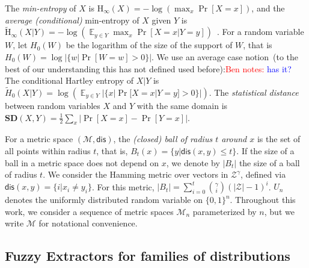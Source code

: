 \documentclass[11pt]{article}
\DeclareMathOperator*{\expe}{\mathbb{E}}
\newcommand{\dis}{\ensuremath{\mathsf{dis}}}
\newcommand{\Hoo}{\mathrm{H}_\infty}
\newcommand{\Hav}{\tilde{\mathrm{H}}_\infty}
\newcommand{\sd}{\ensuremath{\mathbf{SD}}}
\newtheorem{definition}[theorem]{Definition}
\newcommand{\authnote}[2]{{\textcolor{red}{\textsf{#1 notes: }\textcolor{blue}{ #2}}\marginpar{\textcolor{red}{\textbf{!!!!!}}}}}
\newcommand{\authnote}[2]{}
\newcommand{\bnote}[1]{{\authnote{Ben}{#1}}}
\begin{document}
The {\em min-entropy} of $X$ is $\Hoo(X) = -\log(\max_x \Pr[X=x])$,
and the {\em average (conditional)} min-entropy of $X$ given $Y$ is  $\Hav(X|Y) = -\log(\expe_{y\in Y} \max_{x} \Pr[X=x|Y=y])$~\cite[Section 2.4]{DBLP:journals/siamcomp/DodisORS08}.   For a random variable $W$, let $H_0(W)$ be the logarithm of the size of the support of $W$,  that is $H_0(W) = \log |\{w | \Pr[W=w]>0\}|$.  We use an average case notion~(to the best of our understanding this has not defined used before):\bnote{has it?}
The conditional Hartley entropy of $X |Y $ is $\tilde{H}_0(X |Y) = \log ( \expe_{y\in Y} |\{x | \Pr[X=x |Y=y]>0\}|)$.
The {\em statistical distance} between random variables $X$ and $Y$ with the same domain is $\sd(X,Y) = \frac12 \sum_x |\Pr[X=x] - \Pr[Y=x]|$.

For a metric space $(\mathcal{M}, \dis)$, the \emph{(closed) ball of radius $t$ around $x$} is the set of all points within radius $t$, that is, $B_t(x) = \{y| \dis(x, y)\leq t\}$.  If the size of a ball in a metric space does not depend on $x$, we denote by $|B_t|$ the size of a ball of radius $t$.  We consider the Hamming metric over vectors in $\mathcal{Z}^\gamma$, defined via $\dis(x,y) = \{i | x_i \neq y_i\}$.  For this metric, $|B_t| = \sum_{i=0}^t {\gamma \choose i} (|\mathcal{Z}|-1)^i $.  $U_n$ denotes the uniformly  distributed random variable on $\{0,1\}^n$.  Throughout this work, we consider a sequence of metric spaces $\mathcal{M}_n$ parameterized by $n$, but we write $\mathcal{M}$ for notational convenience.

\subsection{Fuzzy Extractors for families of distributions}\label{sec:fuzz extractor}
\end{document}
